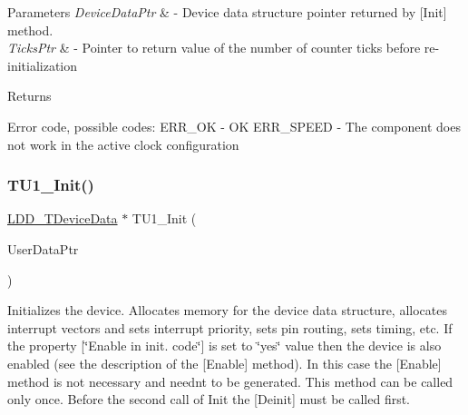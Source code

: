 \begin{DoxyParams}{Parameters}
{\em Device\+Data\+Ptr} & -\/ Device data structure pointer returned by \mbox{[}Init\mbox{]} method. \\
\hline
{\em Ticks\+Ptr} & -\/ Pointer to return value of the number of counter ticks before re-\/initialization \\
\hline
\end{DoxyParams}
\begin{DoxyReturn}{Returns}

\begin{DoxyItemize}
\item Error code, possible codes\+: E\+R\+R\+\_\+\+OK -\/ OK E\+R\+R\+\_\+\+S\+P\+E\+ED -\/ The component does not work in the active clock configuration 
\end{DoxyItemize}
\end{DoxyReturn}
\mbox{\label{group___t_u1__module_ga9bfbdf45fe9128c8d9e4245e3480d6da}} 
\subsubsection{\texorpdfstring{T\+U1\+\_\+\+Init()}{TU1\_Init()}}
{\footnotesize\ttfamily \hyperlink{group___p_e___types__module_gac5cf1362f1f0e3a2ce71b1bf2276d091}{L\+D\+D\+\_\+\+T\+Device\+Data} $\ast$ T\+U1\+\_\+\+Init (\begin{DoxyParamCaption}\item[{\hyperlink{group___p_e___types__module_ga0b66a73f87238a782318aa0be7578e35}{L\+D\+D\+\_\+\+T\+User\+Data} $\ast$}]{User\+Data\+Ptr }\end{DoxyParamCaption})}



Initializes the device. Allocates memory for the device data structure, allocates interrupt vectors and sets interrupt priority, sets pin routing, sets timing, etc. If the property \mbox{[}\char`\"{}\+Enable in init. code\char`\"{}\mbox{]} is set to \char`\"{}yes\char`\"{} value then the device is also enabled (see the description of the \mbox{[}Enable\mbox{]} method). In this case the \mbox{[}Enable\mbox{]} method is not necessary and needn\textquotesingle{}t to be generated. This method can be called only once. Before the second call of Init the \mbox{[}Deinit\mbox{]} must be called first. 


